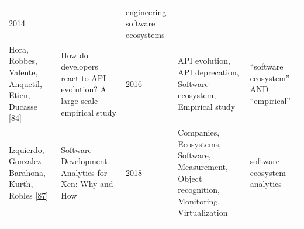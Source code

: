 \documentclass[]{book}
\begin{document}
\begin{longtable}[]{@{}lllll@{}}
\begin{minipage}[t]{0.02\columnwidth}
2014\strut
\end{minipage} & \begin{minipage}[t]{0.34\columnwidth}\raggedright\strut
\strut
\end{minipage} & \begin{minipage}[t]{0.13\columnwidth}\raggedright\strut
engineering software ecosystems\strut
\end{minipage}\tabularnewline
\begin{minipage}[t]{0.05\columnwidth}\raggedright\strut
Hora, Robbes, Valente, Anquetil, Etien, Ducasse
{[}\protect\hyperlink{ref-Hora2016}{84}{]}\strut
\end{minipage} & \begin{minipage}[t]{0.31\columnwidth}\raggedright\strut
How do developers react to API evolution? A large-scale empirical
study\strut
\end{minipage} & \begin{minipage}[t]{0.02\columnwidth}\raggedright\strut
2016\strut
\end{minipage} & \begin{minipage}[t]{0.34\columnwidth}\raggedright\strut
API evolution, API deprecation, Software ecosystem, Empirical
study\strut
\end{minipage} & \begin{minipage}[t]{0.13\columnwidth}\raggedright\strut
``software ecosystem'' AND ``empirical''\strut
\end{minipage}\tabularnewline
\begin{minipage}[t]{0.05\columnwidth}\raggedright\strut
Izquierdo, Gonzalez-Barahona, Kurth, Robles
{[}\protect\hyperlink{ref-Izquierdo2018}{87}{]}\strut
\end{minipage} & \begin{minipage}[t]{0.31\columnwidth}\raggedright\strut
Software Development Analytics for Xen: Why and How\strut
\end{minipage} & \begin{minipage}[t]{0.02\columnwidth}\raggedright\strut
2018\strut
\end{minipage} & \begin{minipage}[t]{0.34\columnwidth}\raggedright\strut
Companies, Ecosystems, Software, Measurement, Object recognition,
Monitoring, Virtualization\strut
\end{minipage} & \begin{minipage}[t]{0.13\columnwidth}\raggedright\strut
software ecosystem analytics\strut
\end{minipage}\tabularnewline
\begin{minipage}[t]{0.05\columnwidth}\raggedright\strut

\end{minipage}
\end{longtable}
\end{document}
